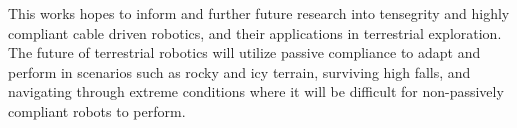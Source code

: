 This works hopes to inform and further future research into tensegrity and highly compliant cable driven robotics, and their applications in terrestrial exploration.
The future of terrestrial robotics will utilize passive compliance to adapt and perform in scenarios such as rocky and icy terrain, surviving high falls, and navigating through extreme conditions where it will be difficult for non-passively compliant robots to perform.









